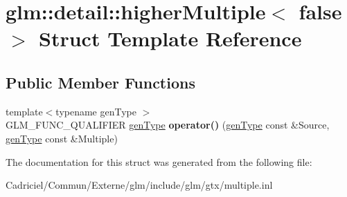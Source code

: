 \hypertarget{structglm_1_1detail_1_1higher_multiple_3_01false_01_4}{}\section{glm\+:\+:detail\+:\+:higher\+Multiple$<$ false $>$ Struct Template Reference}
\label{structglm_1_1detail_1_1higher_multiple_3_01false_01_4}
\subsection*{Public Member Functions}
\begin{DoxyCompactItemize}
\item 
{\footnotesize template$<$typename gen\+Type $>$ }\\G\+L\+M\+\_\+\+F\+U\+N\+C\+\_\+\+Q\+U\+A\+L\+I\+F\+I\+ER \hyperlink{structglm_1_1detail_1_1gen_type}{gen\+Type} {\bfseries operator()} (\hyperlink{structglm_1_1detail_1_1gen_type}{gen\+Type} const \&Source, \hyperlink{structglm_1_1detail_1_1gen_type}{gen\+Type} const \&Multiple)\hypertarget{structglm_1_1detail_1_1higher_multiple_3_01false_01_4_ae121db4aac2a541989b912b3966bffdb}{}\label{structglm_1_1detail_1_1higher_multiple_3_01false_01_4_ae121db4aac2a541989b912b3966bffdb}

\end{DoxyCompactItemize}


The documentation for this struct was generated from the following file\+:\begin{DoxyCompactItemize}
\item 
Cadriciel/\+Commun/\+Externe/glm/include/glm/gtx/multiple.\+inl\end{DoxyCompactItemize}
